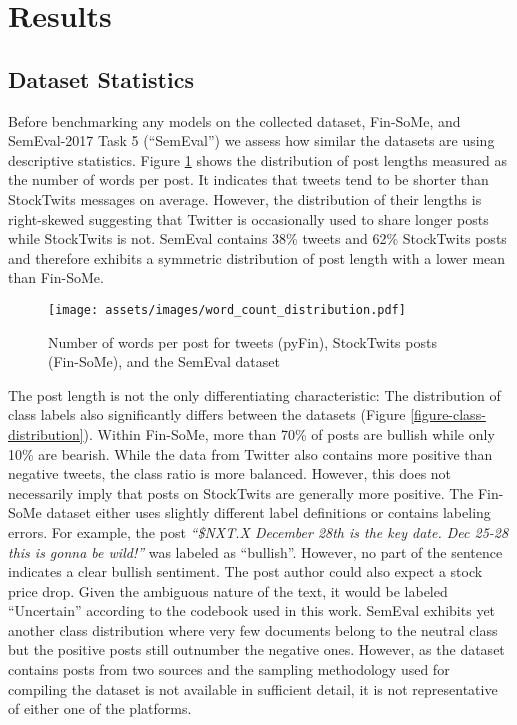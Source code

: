 \section{Results}

\subsection{Dataset Statistics}
\label{section-dataset-diffs}
Before benchmarking any models on the collected dataset, Fin-SoMe, and SemEval-2017 Task 5 (``SemEval'') \cite{cortis2017semeval} we assess how similar the datasets are using descriptive statistics. Figure \ref{figure-word-counts} shows the distribution of post lengths measured as the number of words per post. It indicates that tweets tend to be shorter than StockTwits messages on average. However, the distribution of their lengths is right-skewed suggesting that Twitter is occasionally used to share longer posts while StockTwits is not. SemEval contains 38\% tweets and 62\% StockTwits posts and therefore exhibits a symmetric distribution of post length with a lower mean than Fin-SoMe.


\begin{figure}[!ht]
	\texttt{[image: assets/images/word\_count\_distribution.pdf]}
	\caption{Number of words per post for tweets (pyFin), StockTwits posts (Fin-SoMe), and the SemEval dataset}
	\label{figure-word-counts}
\end{figure}

The post length is not the only differentiating characteristic: The distribution of class labels also significantly differs between the datasets (Figure \ref{figure-class-distribution}). Within Fin-SoMe, more than 70\% of posts are bullish while only 10\% are bearish. While the data from Twitter also contains more positive than negative tweets, the class ratio is more balanced. However, this does not necessarily imply that posts on StockTwits are generally more positive. The Fin-SoMe dataset either uses slightly different label definitions or contains labeling errors. For example, the post \emph{``\$NXT.X December 28th is the key date. Dec 25-28 this is gonna be wild!''} was labeled as ``bullish''. However, no part of the sentence indicates a clear bullish sentiment. The post author could also expect a stock price drop. Given the ambiguous nature of the text, it would be labeled ``Uncertain'' according to the codebook used in this work. SemEval exhibits yet another class distribution where very few documents belong to the neutral class but the positive posts still outnumber the negative ones. However, as the dataset contains posts from two sources and the sampling methodology used for compiling the dataset is not available in sufficient detail, it is not representative of either one of the platforms.

